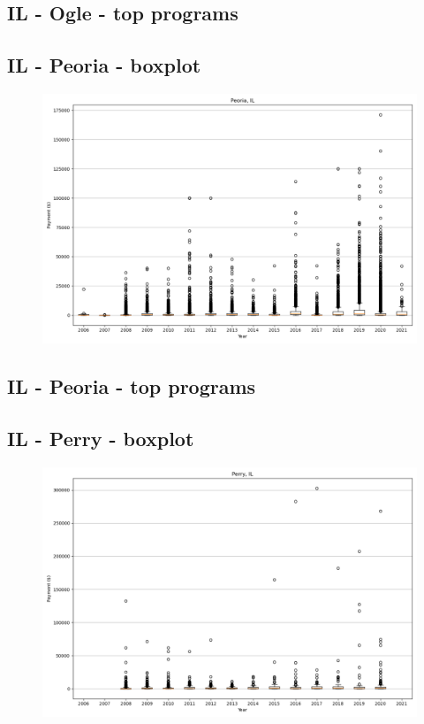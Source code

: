 \subsection*{IL - Ogle - top programs}

\newpage
\subsection*{IL - Peoria - boxplot}
\begin{figure}[h]
\centering
\includegraphics[width=7in]{../output/boxplots/counties/Peoria-IL_boxplot.png}
\end{figure}


\subsection*{IL - Peoria - top programs}

\newpage
\subsection*{IL - Perry - boxplot}
\begin{figure}[h]
\centering
\includegraphics[width=7in]{../output/boxplots/counties/Perry-IL_boxplot.png}
\end{figure}


